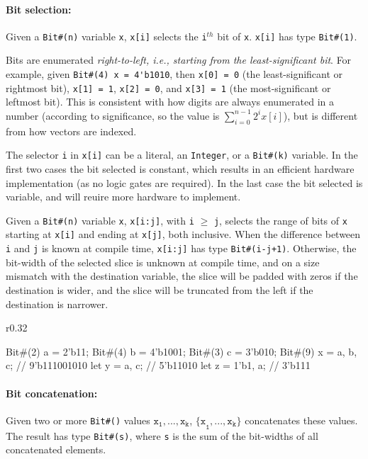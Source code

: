 \paragraph{Bit selection:}
Given a \verb|Bit#(n)| variable \verb|x|,
\verb|x[i]| selects the \verb|i|$^{th}$ bit of \verb|x|.
\verb|x[i]| has type \verb|Bit#(1)|.

Bits are enumerated \emph{right-to-left, i.e., starting from the least-significant bit}.
For example, given \verb|Bit#(4) x = 4'b1010|,
then \verb|x[0] = 0| (the least-significant or rightmost bit), 
\verb|x[1] = 1|, \verb|x[2] = 0|,
and \verb|x[3] = 1| (the most-significant or leftmost bit).
This is consistent with how digits are always enumerated in a number (according to significance, so the value is $\sum_{i=0}^{n-1}2^ix[i]$),
but is different from how vectors are indexed.

The selector \verb|i| in \verb|x[i]| can be a literal, an \verb|Integer|, or a \verb|Bit#(k)| variable. In the first two cases the bit selected is constant,
which results in an efficient hardware implementation (as no logic gates are required).
In the last case the bit selected is variable, and will reuire more hardware to implement.

Given a \verb|Bit#(n)| variable \verb|x|,
\verb|x[i:j]|, with \verb|i| $\geq$ \verb|j|, selects the range of bits of \verb|x|
starting at \verb|x[i]| and ending at \verb|x[j]|, both inclusive.
When the difference between \verb|i| and \verb|j| is known at compile time,
\verb|x[i:j]| has type \verb|Bit#(i-j+1)|.
Otherwise, the bit-width of the selected slice is unknown at compile time,
and on a size mismatch with the destination variable,
the slice will be padded with zeros if the destination is wider,
and the slice will be truncated from the left if the destination is narrower.


\begin{wrapfigure}{r}{0.32\columnwidth}
\vspace{-2em}
\begin{mscode}
Bit#(2) a = 2'b11;
Bit#(4) b = 4'b1001;
Bit#(3) c = 3'b010;
Bit#(9) x = 
  {a, b, c};  // 9'b111001010
let y = {a, c};   // 5'b11010
let z = {1'b1, a};  // 3'b111
\end{mscode}
\vspace{-2.5em}
\end{wrapfigure}

\paragraph{Bit concatenation:}
Given two or more \verb|Bit#()| values $\texttt{x}_\texttt{1},...,\texttt{x}_\texttt{k}$,
$\texttt{\{x}_\texttt{1},...,\texttt{x}_\texttt{k}\texttt{\}}$ concatenates these values. The result has type \verb|Bit#(s)|, where \verb|s| is the sum of the bit-widths of all concatenated elements.

